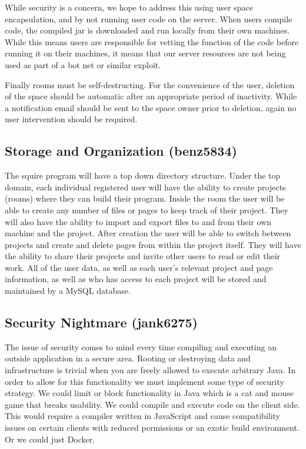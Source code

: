 \documentclass[11pt]{report}
\begin{document}
While security is a concern, we hope to address this using user space encapsulation, and by not running user code on the server. When users compile code, the compiled jar is downloaded and run locally from their own machines. While this means users are responsible for vetting the function of the code before running it on their machines, it means that our server resources are not being used as part of a bot net or similar exploit.

Finally rooms must be self-destructing. For the convenience of the user, deletion of the space should be automatic after an appropriate period of inactivity. While a notification email should be sent to the space owner prior to deletion, again no user intervention should be required.

\subsection{Storage and Organization (benz5834)}
The squire program will have a top down directory structure.
Under the top domain, each individual registered user will have the ability to create projects (rooms) where they can build their program. 
Inside the room the user will be able to create any number of files or pages to keep track of their project. 
They will also have the ability to import and export files to and from their own machine and the project. 
After creation the user will be able to switch between projects and create and delete pages from within the project itself.  
They will have the ability to share their projects and invite other users to read or edit their work. 
All of the user data, as well as each user’s relevant project and page information, as well as who has access to each project will be stored and maintained by a MySQL database.

\subsection{Security Nightmare (jank6275)}
The issue of security comes to mind every time compiling and executing an outside application in a secure area. Rooting or destroying data and infrastructure is trivial when you are freely allowed to execute arbitrary Java. In order to allow for this functionality we must implement some type of security strategy. We could limit or block functionality in Java which is a cat and mouse game that breaks usability. We could compile and execute code on the client side. This would require a compiler written in JavaScript and cause compatibility issues on certain clients with reduced permissions or an exotic build environment. Or we could just Docker.
\end{document}
